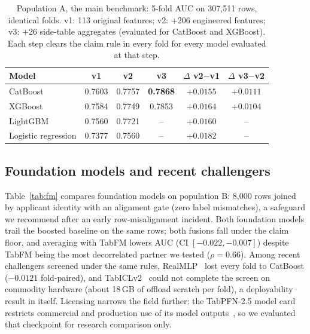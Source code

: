 \documentclass[conference]{IEEEtran}
\begin{document}
\begin{table}[t]
\centering
\caption{Population A, the main benchmark: 5-fold AUC on 307{,}511 rows,
identical folds. v1: 113 original features; v2: $+$206 engineered features;
v3: $+$26 side-table aggregates (evaluated for CatBoost and XGBoost). Each
step clears the claim rule in every fold for every model evaluated at that
step.}
\label{tab:main}
\begin{tabular}{@{}l c c c c c@{}}
\toprule
\textbf{Model} & \textbf{v1} & \textbf{v2} & \textbf{v3} & \textbf{$\Delta$ v2$-$v1} & \textbf{$\Delta$ v3$-$v2} \\
\midrule
CatBoost & 0.7603 & 0.7757 & \textbf{0.7868} & $+0.0155$ & $+0.0111$ \\
XGBoost & 0.7584 & 0.7749 & 0.7853 & $+0.0164$ & $+0.0104$ \\
LightGBM & 0.7560 & 0.7721 & -- & $+0.0160$ & -- \\
Logistic regression & 0.7377 & 0.7560 & -- & $+0.0182$ & -- \\
\bottomrule
\end{tabular}
\end{table}

\subsection{Foundation models and recent challengers}
Table~\ref{tab:fm} compares foundation models on population B: 8{,}000 rows
joined by applicant identity with an alignment gate (zero label mismatches),
a safeguard we recommend after an early row-misalignment incident. Both
foundation models trail the boosted baseline on the same rows; both fusions
fall under the claim floor, and averaging with TabFM lowers AUC
(CI $[-0.022, -0.007]$) despite TabFM being the most decorrelated partner
we tested ($\rho = 0.66$). Among recent challengers screened under the same
rules, RealMLP~\cite{holzmuller2024} lost every fold to CatBoost
($-0.0121$ fold-paired), and TabICLv2~\cite{qu2026} could not complete the
screen on commodity hardware (about 18\,GB of offload scratch per fold), a
deployability result in itself. Licensing narrows the field further: the
TabPFN-2.5 model card restricts commercial and production use of its model
outputs~\cite{tabpfn25}, so we evaluated that checkpoint for research
comparison only.
\end{document}
